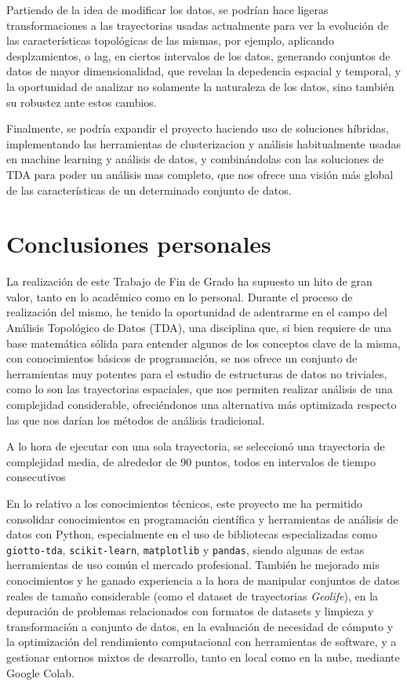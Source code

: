Partiendo de la idea de modificar los datos, se podrían hace ligeras transformaciones a las trayectorias usadas actualmente para ver la evolución de las características topológicas de las mismas, por ejemplo, aplicando desplzamientos, o lag, en ciertos intervalos de los datos, generando conjuntos de datos de mayor dimensionalidad, que revelan la depedencia espacial y temporal, y la oportunidad de analizar no solamente la naturaleza de los datos, sino también su robustez ante estos cambios.

Finalmente, se podría expandir el proyecto haciendo uso de soluciones híbridas, implementando las herramientas de clusterizacion y análisis habitualmente usadas en machine learning y análisis de datos, y combinándolas con las soluciones de TDA para poder un análisis mas completo, que nos ofrece una visión más global de las características de un determinado conjunto de datos.

\section{Conclusiones personales} \label{sct:resultados_conclusiones}

La realización de este Trabajo de Fin de Grado ha supuesto un hito de gran valor, tanto en lo académico como en lo personal. Durante el proceso de realización del mismo, he tenido la oportunidad de adentrarme en el campo del Análisis Topológico de Datos (TDA), una disciplina que, si bien requiere de una base matemática sólida para entender algunos de los conceptos clave de la misma, con conocimientos básicos de programación, se nos ofrece un conjunto de herramientas muy potentes para el estudio de estructuras de datos no triviales, como lo son las trayectorias espaciales, que nos permiten realizar análisis de una complejidad considerable, ofreciéndonos una alternativa más optimizada respecto las que nos darían los métodos de análisis tradicional.

A lo hora de ejecutar con una sola trayectoria, se seleccionó una trayectoria de complejidad media, de alrededor de 90 puntos, todos en intervalos de tiempo consecutivos

En lo relativo a los conocimientos técnicos, este proyecto me ha permitido consolidar conocimientos en programación científica y herramientas de análisis de datos con Python, especialmente en el uso de bibliotecas especializadas como \texttt{giotto-tda}, \texttt{scikit-learn}, \texttt{matplotlib} y \texttt{pandas}, siendo algunas de estas herramientas de uso común el mercado profesional. También he mejorado mis conocimientos y he ganado experiencia a la hora de manipular conjuntos de datos reales de tamaño considerable (como el dataset de trayectorias \textit{Geolife}), en la depuración de  problemas relacionados con formatos de datasets y limpieza y transformación a conjunto de datos, en la evaluación de necesidad de cómputo y la optimización del rendimiento computacional con herramientas de software, y a gestionar entornos mixtos de desarrollo, tanto en local como en la nube, mediante Google Colab.

